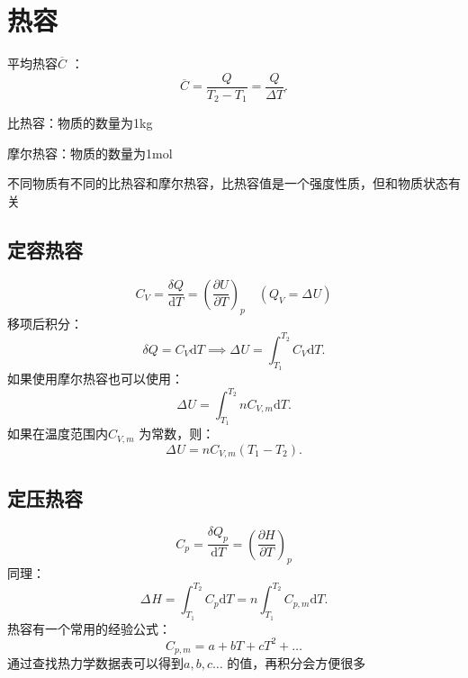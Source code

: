 \section{热容}%
\label{sec:热容}
平均热容$\overline{C}$ ：\[
    \overline{C} = \frac{Q}{T_2-T_1} = \frac{Q}{\Delta T}
.\]

比热容：物质的数量为1kg

摩尔热容：物质的数量为1mol

不同物质有不同的比热容和摩尔热容，比热容值是一个强度性质，但和物质状态有关
\subsection{定容热容}%
\label{sub:定容热容}
\begin{equation}
    \label{eq:定容热容}
    C_{V} = \frac{\delta Q}{\mathrm{d}T} = \left(\frac{\partial U}{\partial T}\right)_{p} \quad \left( Q_{V} = \Delta_\text{}U  \right) 
\end{equation}
移项后积分：\[
    \delta Q = C_{V}\mathrm{d}T \implies \Delta_\text{}U  = \int_{T_1}^{T_2} C_{V} \mathrm{d}T
.\]
如果使用摩尔热容也可以使用：\[
    \Delta_\text{}U = \int_{T_1}^{T_2} nC_{V,m} \mathrm{d}T 
.\]
如果在温度范围内$C_{V,m}$ 为常数，则：\[
    \Delta_\text{}U = nC_{V,m}\left( T_1-T_2 \right) 
.\]
\subsection{定压热容}%
\label{sub:定压热容}
\begin{equation}
    \label{eq:定压热容}
    C_{p} = \frac{\delta Q_{p}}{\mathrm{d}T} = \left(\frac{\partial H}{\partial T}\right)_{p}
\end{equation}
同理：\[
    \Delta_\text{}H = \int_{T_1}^{T_2} C_{p} \mathrm{d}T = n \int_{T_1}^{T_2} C_{p,m} \mathrm{d}T 
.\]
热容有一个常用的经验公式：
\begin{equation}
    \label{eq:热容的经验公式}
    C_{p,m} = a+bT+cT^2 +\ldots 
\end{equation}
通过查找热力学数据表可以得到$a,b,c\ldots $ 的值，再积分会方便很多
